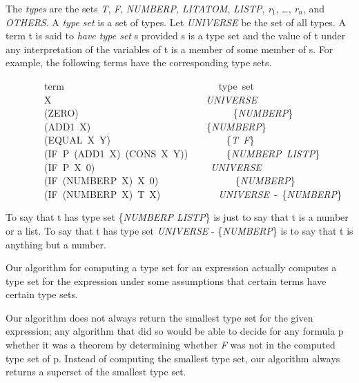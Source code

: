 \documentclass[10pt]{book}
\newenvironment{pubasis}{\begin{flushleft}}{\end{flushleft}}
\begin{document}
The \emph{types} are the sets  \emph{T}, \emph{F}, \emph{NUMBERP},
\emph{LITATOM}, \emph{LISTP}, \emph{r}$_{1}$, \ldots{}, \emph{r}$_{n}$, and \emph{OTHERS}.
A \emph{type set} is a set of types.  Let \emph{UNIVERSE}
be the set of all types.  A term t is said to
\emph{have type set} s provided s is a type set and
the value of t under any interpretation of the variables
of t is a member of some member of s.  For example,
the following terms have the corresponding type sets.
\begin{pubasis}
~~~~~~~~term~~~~~~~~~~~~~~~~~~~~~~~~~~~~~~~~type~set\\

~~~~~~~~X~~~~~~~~~~~~~~~~~~~~~~~~~~~~~~~~\emph{UNIVERSE}\\

~~~~~~~~(ZERO)~~~~~~~~~~~~~~~~~~~~~~~~~~~~~~~~\{\emph{NUMBERP}\}\\

~~~~~~~~(ADD1~X)~~~~~~~~~~~~~~~~~~~~~~~~\{\emph{NUMBERP}\}\\

~~~~~~~~(EQUAL~X~Y)~~~~~~~~~~~~~~~~~~~~~~~~\{\emph{T~F}\}\\

~~~~~~~~(IF~P~(ADD1~X)~(CONS~X~Y))~~~~~~~~\{\emph{NUMBERP~LISTP}\}\\

~~~~~~~~(IF~P~X~0)~~~~~~~~~~~~~~~~~~~~~~~~\emph{UNIVERSE}\\

~~~~~~~~(IF~(NUMBERP~X)~X~0)~~~~~~~~~~~~~~~~\{\emph{NUMBERP}\}\\

~~~~~~~~(IF~(NUMBERP~X)~T~X)~~~~~~~~~~~~\emph{UNIVERSE}~-~\{\emph{NUMBERP}\}\\
\end{pubasis}
To say that t has type set \{\emph{NUMBERP LISTP}\} is just
to say that t is a number or a list.  To say that t has type
set \emph{UNIVERSE} - \{\emph{NUMBERP}\} is to say that t is anything
but a number.

Our algorithm for computing a type set for an expression
actually computes a type set for the expression under
some assumptions that certain terms have certain
type sets.

Our algorithm does not always return the
smallest type set for the given expression; any
algorithm that did so would be able to decide for
any formula p whether it was a theorem by determining
whether  \emph{F} was not in the computed type set of p.
Instead of computing
the smallest type set, our algorithm always returns
a superset of the smallest type set.
\end{document}
